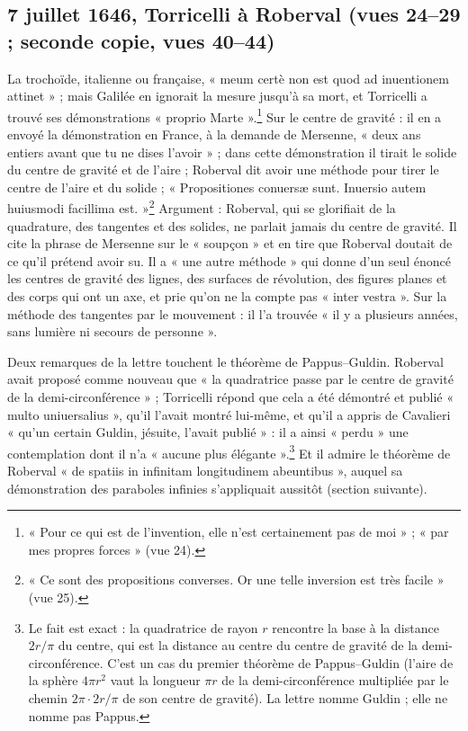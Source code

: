 \documentclass[11pt,a4paper]{article}
\begin{document}
\subsection*{7 juillet 1646, Torricelli à Roberval (vues 24--29 ; seconde copie, vues 40--44)}

La trochoïde, italienne ou française, « meum certè non est quod ad inuentionem
attinet » ; mais Galilée en ignorait la mesure jusqu'à sa mort, et Torricelli a
trouvé ses démonstrations « proprio Marte ».\footnote{« Pour ce qui est de
l'invention, elle n'est certainement pas de moi » ; « par mes propres forces »
(vue 24).} Sur le centre de gravité : il en a envoyé la démonstration en France,
à la demande de Mersenne, « deux ans entiers avant que tu ne dises l'avoir » ;
dans cette démonstration il tirait le solide du centre de gravité et de l'aire ;
Roberval dit avoir une méthode pour tirer le centre de l'aire et du solide ;
« Propositiones conuersæ sunt. Inuersio autem huiusmodi facillima
est. »\footnote{« Ce sont des propositions converses. Or une telle inversion est
très facile » (vue 25).} Argument : Roberval, qui se glorifiait de la
quadrature, des tangentes et des solides, ne parlait jamais du centre de gravité.
Il cite la phrase de Mersenne sur le « soupçon » et en tire que Roberval doutait
de ce qu'il prétend avoir su. Il a « une autre méthode » qui donne d'un seul
énoncé les centres de gravité des lignes, des surfaces de révolution, des
figures planes et des corps qui ont un axe, et prie qu'on ne la compte pas
« inter vestra ». Sur la méthode des tangentes par le mouvement : il l'a
trouvée « il y a plusieurs années, sans lumière ni secours de personne ».

Deux remarques de la lettre touchent le théorème de Pappus--Guldin. Roberval
avait proposé comme nouveau que « la quadratrice passe par le centre de gravité
de la demi-circonférence » ; Torricelli répond que cela a été démontré et publié
« multo uniuersalius », qu'il l'avait montré lui-même, et qu'il a appris de
Cavalieri « qu'un certain Guldin, jésuite, l'avait publié » : il a ainsi
« perdu » une contemplation dont il n'a « aucune plus élégante ».\footnote{Le
fait est exact : la quadratrice de rayon $r$ rencontre la base à la distance
$2r/\pi$ du centre, qui est la distance au centre du centre de gravité de la
demi-circonférence. C'est un cas du premier théorème de Pappus--Guldin (l'aire
de la sphère $4\pi r^2$ vaut la longueur $\pi r$ de la demi-circonférence
multipliée par le chemin $2\pi\cdot 2r/\pi$ de son centre de gravité). La lettre
nomme Guldin ; elle ne nomme pas Pappus.} Et il admire le théorème de Roberval
« de spatiis in infinitam longitudinem abeuntibus », auquel sa démonstration des
paraboles infinies s'appliquait aussitôt (section suivante).
\end{document}

